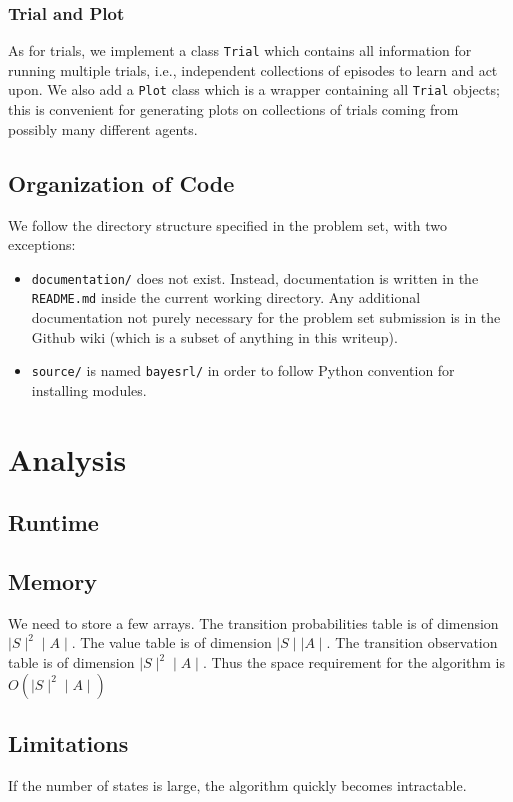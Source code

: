 \documentclass{pset}
\begin{document}
\subsubsection{Trial and Plot}
As for trials, we implement a class \texttt{Trial} which contains all information for running multiple trials, i.e., independent collections of episodes to learn and act upon. We also add a \texttt{Plot} class which is a wrapper containing all \texttt{Trial} objects; this is convenient for generating plots on collections of trials coming from possibly many different agents.

\subsection{Organization of Code}
We follow the directory structure specified in the problem set, with two
exceptions:
\begin{itemize}
\item \texttt{documentation/} does not exist. Instead, documentation is written
in the \texttt{README.md} inside the current working directory. Any additional
documentation not purely necessary for the problem set submission is in the
Github wiki (which is a subset of anything in this writeup).
\item \texttt{source/} is named \texttt{bayesrl/} in order to follow Python
convention for installing modules.
\end{itemize}

\section{Analysis}

\subsection{Runtime}

\subsection{Memory}
We need to store a few arrays. The transition probabilities table is of
dimension $\mid S \mid ^2 \mid A \mid$. The value table is of dimension $\mid S
\mid \mid A \mid$. The transition observation table is of dimension $\mid S \mid
^2 \mid A \mid$. Thus the space requirement for the algorithm is $O(\mid S \mid
^2 \mid A \mid)$

\subsection{Limitations}
If the number of states is large, the algorithm quickly becomes intractable.
\end{document}
